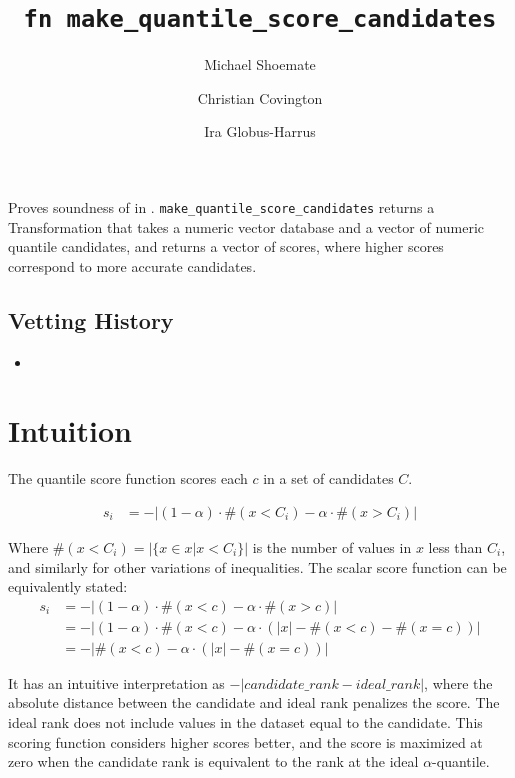 \documentclass{article}
\title{\texttt{fn make\_quantile\_score\_candidates}}
\author{Michael Shoemate \and Christian Covington \and Ira Globus-Harrus}
\begin{document}
\maketitle


\contrib

Proves soundness of 
in .
\texttt{make\_quantile\_score\_candidates} returns a Transformation that
takes a numeric vector database and a vector of numeric quantile candidates,
and returns a vector of scores, where higher scores correspond to more accurate candidates.

\subsection*{Vetting History}
\begin{itemize}
    \item {}
\end{itemize}

\section{Intuition}
The quantile score function scores each $c$ in a set of candidates $C$.

\begin{equation}
\begin{array}{rl}
    s_i &= -|(1 - \alpha) \cdot \#(x < C_i) - \alpha \cdot \#(x > C_i)|
\end{array}
\end{equation}

Where $\#(x < C_i) = |\{x \in x | x < C_i\}|$ is the number of values in $x$ less than $C_i$,
and similarly for other variations of inequalities.
The scalar score function can be equivalently stated:
\begin{align}
    s_i &= -|(1 - \alpha) \cdot \#(x < c) - \alpha \cdot \#(x > c)| \\
    &= -|(1 - \alpha) \cdot \#(x < c) - \alpha \cdot (|x| - \#(x < c) - \#(x = c))| \\
    &= -|\#(x < c) - \alpha \cdot (|x| - \#(x = c))|
\end{align}

It has an intuitive interpretation as $-|candidate\_rank - ideal\_rank|$,
where the absolute distance between the candidate and ideal rank penalizes the score.
The ideal rank does not include values in the dataset equal to the candidate.
This scoring function considers higher scores better,
and the score is maximized at zero when the candidate rank is equivalent to the rank at the ideal $\alpha$-quantile.
\end{document}
